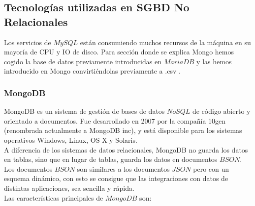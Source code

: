 \documentclass[12pt,a4paper]{article}
\begin{document}
\subsection{Tecnologías utilizadas en SGBD No Relacionales}  \label{pto51}

Los servicios de $MySQL$ están consumiendo muchos recursos de la máquina en su mayoría de CPU y IO de disco.
Para sección donde se explica Mongo hemos cogido la base de datos previamente introducidas en $MariaDB$ y las hemos introducido en Mongo convirtiéndolas previamente a .csv \cite{cDB10}.


\subsubsection{MongoDB} \label{pto511}

MongoDB es un sistema de gestión de bases de datos $NoSQL$ de código abierto y orientado a documentos. Fue desarrollado en 2007 por la compañía 10gen (renombrada actualmente a MongoDB inc), y está disponible para los sistemas operativos Windows, Linux, OS X y Solaris. \\

A diferencia de los sistemas de datos relacionales, MongoDB no guarda los datos en tablas, sino que en lugar de tablas, guarda los datos en documentos $BSON$. Los documentos $BSON$ son similares a los documentos $JSON$ pero con un esquema dinámico, con esto se consigue que las integraciones con datos de distintas aplicaciones, sea sencilla y rápida. \\


Las características principales de $MongoDB$ son:
\end{document}
